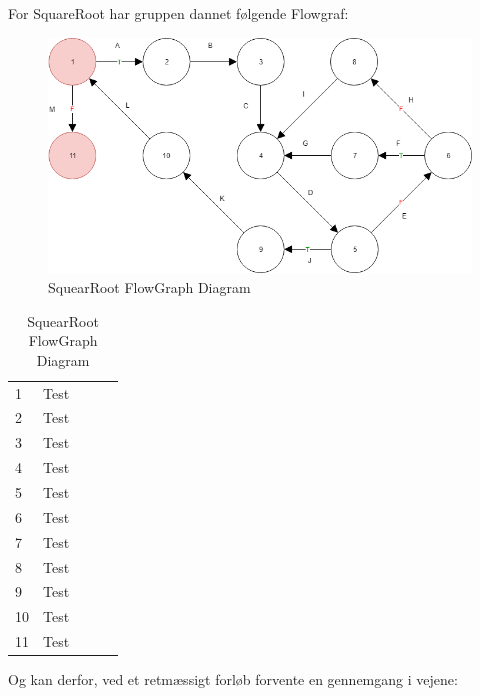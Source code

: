 \documentclass[11pt]{article}
\begin{document}
    \noindent
    For SquareRoot har gruppen dannet følgende Flowgraf:\\
    \begin{table}[H]
        \begin{minipage}{.7\textwidth}
            \begin{figure}[H]
                \centering
                \includegraphics[width=1\textwidth,angle=0]{Struktureret_System_Udvikling/Workshop_3/SquareRoot_FlowGraph.png}
                \caption{SquearRoot FlowGraph Diagram}
                \label{fig:SquearRootGraph}
            \end{figure}
        \end{minipage}
        \begin{minipage}{.3\textwidth}
            \quad
            \begin{tabular}{lllll}
                1 & Test\\
                2 & Test\\
                3 & Test\\
                4 & Test\\
                5 & Test\\
                6 & Test\\
                7 & Test\\
                8 & Test\\
                9 & Test\\
                10 & Test\\
                11 & Test\\
            \end{tabular}
        \end{minipage}
     \end{table}
    \noindent
    Og kan derfor, ved et retmæssigt forløb forvente en gennemgang i vejene:\\
\end{document}
